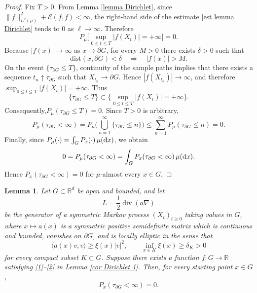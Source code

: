 \documentclass[11pt]{article}
\renewcommand{\d}{{\rm d}}
\newcommand{\R}{\mathbb R}
\newtheorem{lemma}[theorem]{Lemma}
\theoremstyle{rem}
\begin{document}
\begin{proof}
Fix $T>0$. From Lemma \ref{lemma Dirichlet}, since
$\|f\|_{L^2(\mu)}^2+\mathcal E(f,f)<\infty$,
the right-hand side of the estimate \eqref{est lemma Dirichlet} tends to $0$ as $\ell\to\infty$. Therefore
\[
P_\mu\bigg[
\sup_{0\leq t\leq T}|f(X_t)|=+\infty
\bigg]=0.
\]
Because $|f(x)|\to\infty$ as $x\to\partial G$, for every $M>0$ there exists $\delta>0$ such that
\[
\mathrm{dist}(x,\partial G)<\delta
\quad\Longrightarrow\quad
|f(x)|>M.
\]
On the event $\{\tau_{\partial G}\leq T\}$, continuity of the sample paths implies that there exists a sequence $t_n\uparrow\tau_{\partial G}$ such that $X_{t_n}\to\partial G$. Hence $|f(X_{t_n})|\to\infty$, and therefore $\sup_{0\leq t\leq T}|f(X_t)|=+\infty$.
Thus
\[
\{\tau_{\partial G}\leq T\}
\subset
\bigg\{
\sup_{0\leq t\leq T}|f(X_t)|=+\infty
\bigg\}.
\]
Consequently,$P_\mu(\tau_{\partial G}\leq T)=0$.
Since $T>0$ is arbitrary,
\[
P_\mu(\tau_{\partial G}<\infty)
=
P_\mu\bigg(\bigcup_{n=1}^\infty\{\tau_{\partial G}\leq n\}\bigg)
\leq
\sum_{n=1}^\infty P_\mu(\tau_{\partial G}\leq n)
=0.
\]
Finally, since $P_\mu(\cdot)=\int_G P_x(\cdot)\,\mu(\d x)$,
we obtain
\[
0
=
P_\mu(\tau_{\partial G}<\infty)
=
\int_G P_x(\tau_{\partial G}<\infty)\,\mu(\d x).
\]
Hence $P_x(\tau_{\partial G}<\infty)=0$ for $\mu$-almost every $x\in G$.
\end{proof}

\begin{lemma}\label{cor Dirichlet 2}
Let $G\subset\R^d$ be open and bounded, and let
\[
L=\frac12\operatorname{div}(a\nabla)
\]
be the generator of a symmetric Markov process $(X_t)_{t\geq0}$ taking values in $G$, where $x\mapsto a(x)$ is a symmetric positive semidefinite matrix which is continuous and bounded, vanishes on $\partial G$, and is locally elliptic in the sense that
\[
\langle a(x)v,v\rangle\geq \xi(x)|v|^2,
\qquad
\inf_{x\in K}\xi(x)\geq\delta_K>0
\]
for every compact subset $K\subset G$. Suppose there exists a function $f:G\to\R$ satisfying \ref{1}--\ref{2} in Lemma \ref{cor Dirichlet 1}. Then, for every starting point $x\in G$,
\[
P_x(\tau_{\partial G}<\infty)=0.
\]
\end{lemma}
\end{document}
